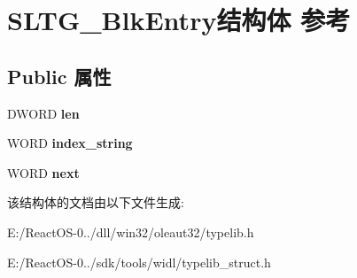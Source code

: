 \hypertarget{struct_s_l_t_g___blk_entry}{}\section{S\+L\+T\+G\+\_\+\+Blk\+Entry结构体 参考}
\label{struct_s_l_t_g___blk_entry}
\subsection*{Public 属性}
\begin{DoxyCompactItemize}
\item 
\mbox{\label{struct_s_l_t_g___blk_entry_a3d26544291df5b5460445f599d74769e}} 
D\+W\+O\+RD {\bfseries len}
\item 
\mbox{\label{struct_s_l_t_g___blk_entry_ace93974fb7b70ebf55477e2fea19fb3e}} 
W\+O\+RD {\bfseries index\+\_\+string}
\item 
\mbox{\label{struct_s_l_t_g___blk_entry_a55bc18676760452c0f2921868ae42d19}} 
W\+O\+RD {\bfseries next}
\end{DoxyCompactItemize}


该结构体的文档由以下文件生成\+:\begin{DoxyCompactItemize}
\item 
E\+:/\+React\+O\+S-\/0../dll/win32/oleaut32/typelib.\+h\item 
E\+:/\+React\+O\+S-\/0../sdk/tools/widl/typelib\+\_\+struct.\+h\end{DoxyCompactItemize}
